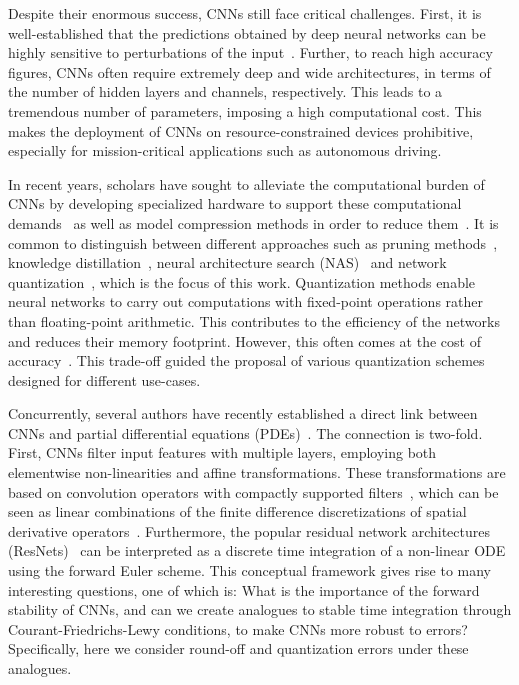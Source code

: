 \documentclass[reqno]{amsart}
\begin{document}
Despite their enormous success, CNNs still face critical challenges. First, it is well-established that the predictions obtained by deep neural networks can be highly sensitive to perturbations of the input~\cite{MoosaviDezfooli:2015wj,goodfellow2018making}. Further, to reach high accuracy figures, CNNs often require extremely deep and wide architectures, in terms of the number of hidden layers and channels, respectively. This leads to a tremendous number of parameters, imposing a high computational cost. This makes the deployment of CNNs on resource-constrained devices prohibitive, especially for mission-critical applications such as autonomous driving.

In recent years, scholars have sought to alleviate the computational burden of CNNs by developing specialized hardware to support these computational demands~\cite{hardware_survey} as well as model compression methods in order to reduce them~\cite{compression_survey}. It is common to distinguish between different approaches such as pruning methods~\cite{pruning_survey}, knowledge distillation~\cite{distillation_survey}, neural architecture search (NAS)~\cite{nas_survey} and network quantization~\cite{hubara2017quantized}, which is the focus of this work. Quantization methods enable neural networks to carry out computations with fixed-point operations rather than floating-point arithmetic. This contributes to the efficiency of the networks and reduces their memory footprint. However, this often comes at the cost of accuracy~\cite{compression_survey}. This trade-off guided the proposal of various quantization schemes designed for different use-cases. 

Concurrently, several authors have recently established a direct link between CNNs and partial differential equations (PDEs)~\cite{E2017,ChaudhariEtAl2017,HaberRuthotto2017}. The connection is two-fold. First, CNNs filter input features with multiple layers, employing both elementwise non-linearities and affine transformations. These transformations are based on convolution operators with compactly supported filters~\cite{goodfellow2016wc}, which can be seen as linear combinations of the finite difference discretizations of spatial derivative operators~\cite{ruthotto2019deep,ephrath2020leanconvnets,eliasof2020diffgcn}. Furthermore, the popular residual network architectures (ResNets)~\cite{he2016deep} can be interpreted as a discrete time integration of a non-linear ODE using the forward Euler scheme. This conceptual framework gives rise to many interesting questions, one of which is: What is the importance of the forward stability of CNNs, and can we create analogues to stable time integration through Courant-Friedrichs-Lewy conditions, to make CNNs more robust to errors? Specifically, here we consider round-off and quantization errors under these analogues. 
\end{document}
